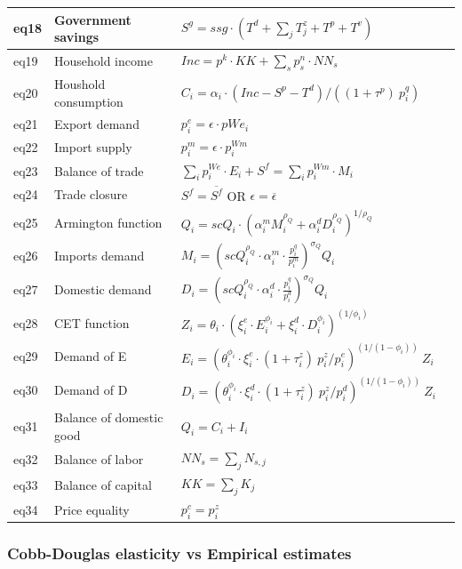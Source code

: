 \begin{table}[!ht]
\begin{tabular}{llll}
		eq18 & Government savings & $S^g = ssg \cdot  (T^d + \sum_j T^z_j + T^p + T^v)$ \\
		\midrule
		eq19 & Household income &  $Inc = p^k \cdot KK + \sum_s p^n_s \cdot NN_s $ \\
		eq20 & Houshold consumption & $C_i = \alpha_i \cdot  (Inc -S^p - T^d) / ((1+\tau^p) ~ p^q_i) $ \\
		\midrule
		eq21 & Export demand & $p^e_i = \epsilon \cdot pWe_i$ \\
		eq22 & Import supply & $p^m_i =\epsilon \cdot p^{Wm}_i$ \\
		eq23 & Balance of trade & $\sum_i p^{We}_i \cdot E_i +S^f = \sum_i p^{Wm}_i \cdot M_i$ \\
		eq24 & Trade closure & $S^f = \overline{S^f}$  \quad OR \quad $\epsilon = \overline{\epsilon}$  \\
		\midrule
		eq25 & Armington function & $Q_i = scQ_i \cdot (\alpha^m_i M_i^{\rho_Q} + \alpha^d_i D_i^{\rho_Q}  )^{1/\rho_Q} $ \\
		eq26 & Imports demand & $M_i = \left( scQ_i^{\rho_Q} \cdot \alpha_i^m \cdot \frac{p_i^q}{p_i^m} \right)^{\sigma_Q} Q_i$ \\
		eq27& Domestic demand & $D_i = \left( scQ_i^{\rho_Q} \cdot \alpha_i^d \cdot \frac{p_i^q}{p_i^d} \right)^{\sigma_Q} Q_i$ \\
		eq28 & CET function & $Z_i  = \theta_i \cdot  (\xi^e_i \cdot E_i^{\phi_i} + \xi^d_i \cdot D_i^{\phi_i} )^{(1/\phi_i)} $  \\
		eq29 & Demand of E & $  E_i = (\theta_i^{\phi_i} \cdot \xi^e_i\cdot (1+\tau^z_i) ~ p^z_i/p^e_i)^{(1/(1-\phi_i))} ~Z_i $ \\
		eq30 & Demand of D & $ D_i = (\theta_i^{\phi_i} \cdot \xi^d_i \cdot (1+\tau^z_i) ~ p^z_i/p^d_i)^{(1/(1-\phi_i))} ~ Z_i $ \\
		\midrule
		eq31 &  Balance of domestic good & $Q_i = C_i + I_i$ &  \\
		eq32 & Balance of labor & $NN_s = \sum_j N_{s,j}$ &   \\
		eq33 & Balance of capital & $KK  = \sum_j K_j $ &   \\
		eq34 & Price equality & $p^c_i = p^z_i$ & \\ 
		\bottomrule
	\end{tabular}
\end{table}

\clearpage

\subsubsection{Cobb-Douglas elasticity vs Empirical estimates}

